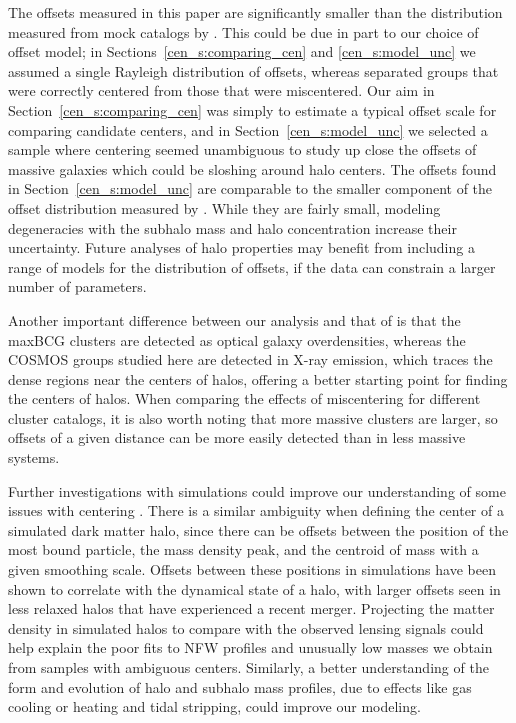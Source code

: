 The offsets measured in this paper are significantly smaller than the
distribution measured from mock catalogs by
\citet{Johnston2007b}. This could be due in part to our choice of
offset model; in Sections~\ref{cen_s:comparing_cen} and \ref{cen_s:model_unc}
we assumed a single Rayleigh distribution of offsets, whereas
\citeauthor{Johnston2007b} separated groups that were correctly
centered from those that were miscentered. Our aim in
Section~\ref{cen_s:comparing_cen} was simply to estimate a typical offset
scale for comparing candidate centers, and in
Section~\ref{cen_s:model_unc} we selected a sample where centering seemed
unambiguous to study up close the offsets of massive galaxies which
could be sloshing around halo centers. The offsets found in
Section~\ref{cen_s:model_unc} are comparable to the smaller component of
the offset distribution measured by \citet{Oguri2010}. While they
are fairly small, modeling degeneracies with the subhalo mass and halo
concentration increase their uncertainty. Future analyses of halo
properties may benefit from including a range of models for the
distribution of offsets, if the data can constrain a larger number of
parameters.

Another important difference between our analysis and that of
\citeauthor{Johnston2007b} is that the maxBCG clusters are detected as
optical galaxy overdensities, whereas the COSMOS groups studied here
are detected in X-ray emission, which traces the dense regions near
the centers of halos, offering a better starting point for finding the
centers of halos. When comparing the effects of miscentering for
different cluster catalogs, it is also worth noting that more massive
clusters are larger, so offsets of a given distance can be more easily
detected than in less massive systems.

Further investigations with simulations could improve our understanding of some issues
with centering \citep[e.g.,][]{Maccio2007, Neto2007, Hilbert2010, Behroozi2011,
  Dietrich2012, Power2012}. There is a similar ambiguity when defining
the center of a simulated dark matter halo, since there can be offsets
between the position of the most bound particle, the mass density
peak, and the centroid of mass with a given smoothing scale. Offsets
between these positions in simulations have been shown to correlate
with the dynamical state of a halo, with larger offsets seen in less
relaxed halos that have experienced a recent merger. Projecting the
matter density in simulated halos to compare with the observed lensing
signals could help explain the poor fits to NFW profiles and unusually
low masses we obtain from samples with ambiguous centers. Similarly, a
better understanding of the form and evolution of halo and subhalo mass
profiles, due to effects like gas cooling or heating and tidal
stripping, could improve our modeling.

